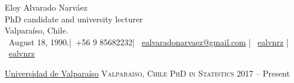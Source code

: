 \documentclass[10pt,a4paper]{article}
\begin{document}
 

\newcommand{\name}{Eloy Alvarado Narváez}
\newcommand{\dob}{August 18, 1990.}
\newcommand{\address}{Valparaíso, Chile.}
\newcommand{\phone}{+56 9 85682232}
\newcommand{\email}{ealvaradonarvaez@gmail.com}
\newcommand{\github}{ealvnrz}
\newcommand{\linkedin}{ealvnrz}

\begin{center}
\huge\name \\

\normalsize PhD candidate and university lecturer \\
\address\\
\faCalendar*[regular]\ \dob \hspace{5pt}|\hspace{5pt}\ \phone \hspace{5pt}|\hspace{5pt} \ \href{mailto:\email}{\email}
\hspace{5pt}|\hspace{5pt}  \ \href{https://github.com/ealvnrz}{\github}
\hspace{5pt}|\hspace{5pt}  \ \href{https://www.linkedin.com/in/ealvnrz/}{\linkedin}
\end{center}








\headedsection 
{\href{https://ideuv.uv.cl/index.php/es/?view=page&id=91}{Universidad de Valparaíso}}
{\textsc{Valparaíso, Chile}}
 {
\headedsubsection 
{\textsc{PhD in Statistics}}
{2017 -- Present}
{}
}
\end{document}
